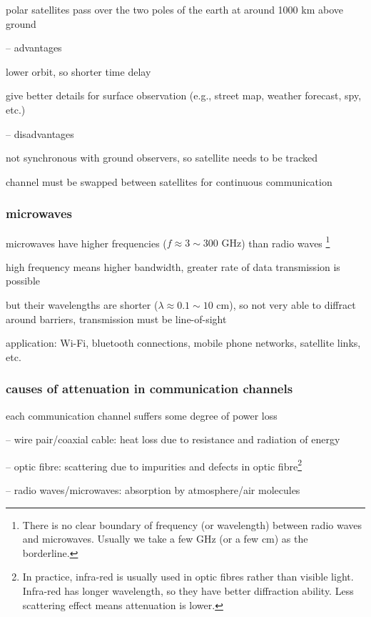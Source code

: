 polar satellites pass over the two poles of the earth at around 1000 km above ground

\begin{compactitem}
	\item[--] advantages
	
	lower orbit, so shorter time delay
	
	give better details for surface observation (e.g., street map, weather forecast, spy, etc.)
	
	\item[--] disadvantages
	
	not synchronous with ground observers, so satellite needs to be tracked
	
	channel must be swapped between satellites for continuous communication
\end{compactitem}



\subsubsection{microwaves}

microwaves have higher frequencies ($f\approx 3 \sim 300 \text{ GHz} $)  than radio waves \footnote{There is no clear boundary of frequency (or wavelength) between radio waves and microwaves. Usually we take a few GHz (or a few cm) as the borderline.}

high frequency means higher bandwidth, greater rate of data transmission is possible

but their wavelengths are shorter ($\lambda \approx 0.1 \sim 10 \text{ cm}$), so not very able to diffract around barriers, transmission must be line-of-sight

\cmt application: Wi-Fi, bluetooth connections, mobile phone networks, satellite links, etc.



\subsubsection*{causes of attenuation in communication channels}

each communication channel suffers some degree of power loss

\begin{compactitem}
	\item[--] wire pair/coaxial cable: heat loss due to resistance and radiation of energy
	
	\item[--] optic fibre: scattering due to impurities and defects in optic fibre\footnote{In practice, infra-red is usually used in optic fibres rather than visible light. Infra-red has longer wavelength, so they have better diffraction ability. Less scattering effect means attenuation is lower.}
	
	\item[--] radio waves/microwaves: absorption by atmosphere/air molecules
\end{compactitem}




